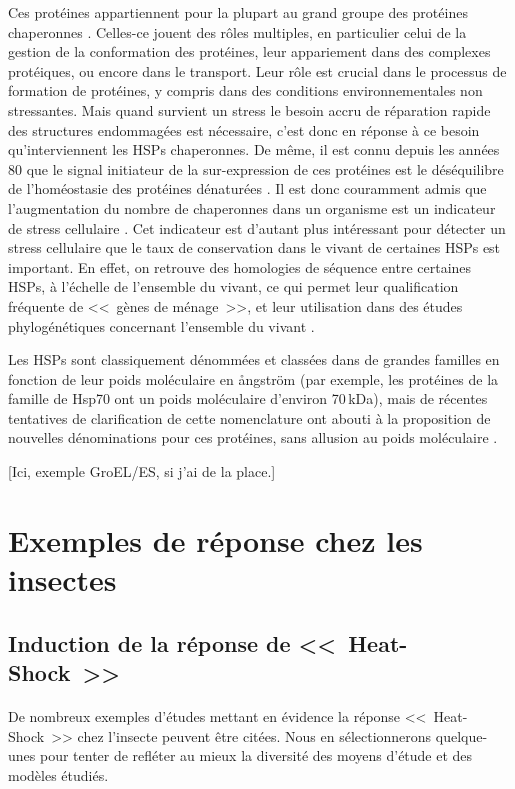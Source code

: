 	Ces protéines appartiennent pour la plupart au grand groupe des protéines chaperonnes \cite{federhoffmann1999}.
	Celles-ce jouent des rôles multiples, en particulier celui de la gestion de la conformation des protéines, leur appariement dans des complexes protéiques, ou encore dans le transport.
	Leur rôle est crucial dans le processus de formation de protéines, y compris dans des conditions environnementales non stressantes.
	Mais quand survient un stress le besoin accru de réparation rapide des structures endommagées est nécessaire, c'est donc en réponse à ce besoin qu'interviennent les HSPs chaperonnes.
	De même, il est connu depuis les années 80 que le signal initiateur de la sur-expression de ces protéines est le déséquilibre de l'homéostasie des protéines dénaturées \cite{ananthan1986}.
	Il est donc couramment admis que l'augmentation du nombre de chaperonnes dans un organisme est un indicateur de stress cellulaire \cite{ryan1996}.
	Cet indicateur est d'autant plus intéressant pour détecter un stress cellulaire que le taux de conservation dans le vivant de certaines HSPs est important.
	En effet, on retrouve des homologies de séquence entre certaines HSPs, à l'échelle de l'ensemble du vivant, ce qui permet leur qualification fréquente de <<~gènes de ménage~>>, et leur utilisation dans des études phylogénétiques concernant l'ensemble du vivant \cite{gupta1995}.

	Les HSPs sont classiquement dénommées et classées dans de grandes familles en fonction de leur poids moléculaire en ångström (par exemple, les protéines de la famille de Hsp70 ont un poids moléculaire d'environ 70\,kDa), mais de récentes tentatives de clarification de cette nomenclature ont abouti à la proposition de nouvelles dénominations pour ces protéines, sans allusion au poids moléculaire \cite{kampinga2009}.

	[Ici, exemple GroEL/ES, si j'ai de la place.]

	\section{Exemples de réponse chez les insectes}

		\subsection{Induction de la réponse de <<~Heat-Shock~>>}

		\paragraph{}
		De nombreux exemples d'études mettant en évidence la réponse <<~Heat-Shock~>> chez l'insecte peuvent être citées.
		Nous en sélectionnerons quelque-unes pour tenter de refléter au mieux la diversité des moyens d'étude et des modèles étudiés.


